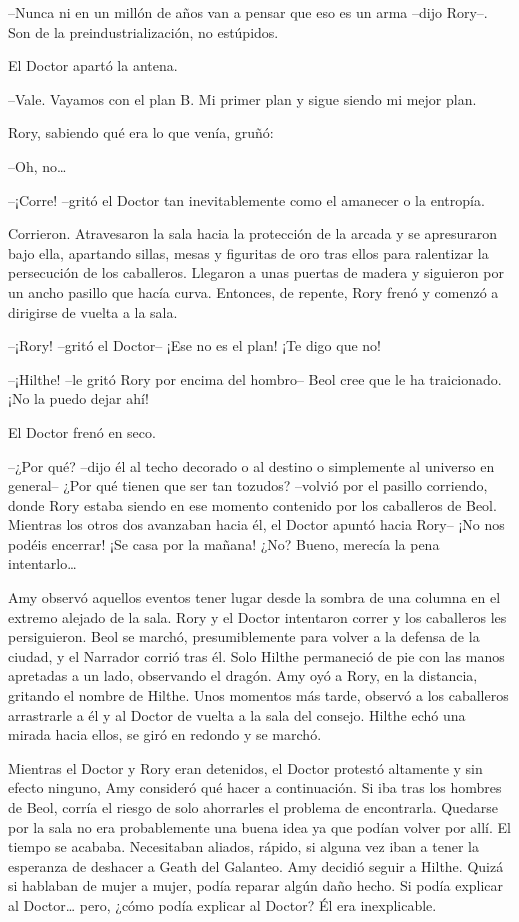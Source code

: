 {--Nunca ni en un millón de años van a pensar que eso es un arma
--dijo Rory--. Son de la preindustrialización, no estúpidos.}

{El Doctor apartó la antena.}

{--Vale. Vayamos con el plan B. Mi primer plan y sigue siendo mi mejor
plan.}

{Rory, sabiendo qué era lo que venía, gruñó:}

{--Oh, no\ldots{}}

{--¡Corre! --gritó el Doctor tan inevitablemente como el amanecer o la
entropía.}

{Corrieron. Atravesaron la sala hacia la protección de la arcada y se
	apresuraron bajo ella, apartando sillas, mesas y figuritas de oro tras
	ellos para ralentizar la persecución de los caballeros. Llegaron a unas
	puertas de madera y siguieron por un ancho pasillo que hacía curva.
	Entonces, de repente, Rory frenó y comenzó a dirigirse de vuelta a la
sala.}

{--¡Rory! --gritó el Doctor-- ¡Ese no es el plan! ¡Te digo que no!}

{--¡Hilthe! --le gritó Rory por encima del hombro-- Beol cree que le
ha traicionado. ¡No la puedo dejar ahí!}

{El Doctor frenó en seco.}

{--¿Por qué? --dijo él al techo decorado o al destino o simplemente al
	universo en general-- ¿Por qué tienen que ser tan tozudos? --volvió por
	el pasillo corriendo, donde Rory estaba siendo en ese momento contenido
	por los caballeros de Beol. Mientras los otros dos avanzaban hacia él,
	el Doctor apuntó hacia Rory-- ¡No nos podéis encerrar! ¡Se casa por la
	mañana! ¿No? Bueno, merecía la pena intentarlo\ldots{}}

\mbox{}

{Amy observó aquellos eventos tener lugar desde la sombra de una columna
	en el extremo alejado de la sala. Rory y el Doctor intentaron correr y
	los caballeros les persiguieron. Beol se marchó, presumiblemente para
	volver a la defensa de la ciudad, y el Narrador corrió tras él. Solo
	Hilthe permaneció de pie con las manos apretadas a un lado, observando
	el dragón. Amy oyó a Rory, en la distancia, gritando el nombre de
	Hilthe. Unos momentos más tarde, observó a los caballeros arrastrarle a
	él y al Doctor de vuelta a la sala del consejo. Hilthe echó una mirada
hacia ellos, se giró en redondo y se marchó.}

{Mientras el Doctor y Rory eran detenidos, el Doctor protestó altamente
	y sin efecto ninguno, Amy consideró qué hacer a continuación. Si iba
	tras los hombres de Beol, corría el riesgo de solo ahorrarles el
	problema de encontrarla. Quedarse por la sala no era probablemente una
	buena idea ya que podían volver por allí. El tiempo se acababa.
	Necesitaban aliados, rápido, si alguna vez iban a tener la esperanza de
	deshacer a Geath del Galanteo. Amy decidió seguir a Hilthe. Quizá si
	hablaban de mujer a mujer, podía reparar algún daño hecho. Si podía
	explicar al Doctor\ldots{} pero, ¿cómo podía explicar al Doctor? Él era
inexplicable.}

